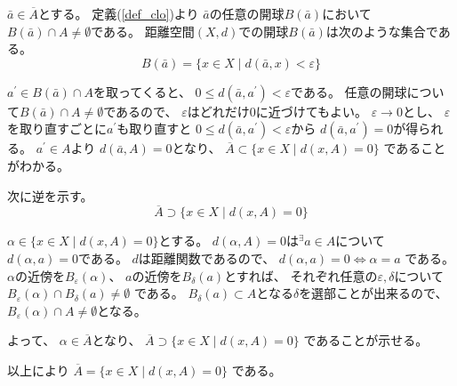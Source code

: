 \documentclass[12pt,b5paper]{ltjsarticle}
\begin{document}
\begin{enumerate}
      $\bar{a}\in \overline{A}$とする。
      定義(\ref{def_clo})より
      $\bar{a}$の任意の開球$B(\bar{a})$において
      $B(\bar{a})\cap A\ne\emptyset$である。
      距離空間$(X,d)$での開球$B(\bar{a})$は次のような集合である。
      \begin{equation}
       B(\bar{a}) = \{ x\in X \mid d(\bar{a},x)<\varepsilon \}
      \end{equation}

      $a^{\prime}\in B(\bar{a})\cap A$を取ってくると、
      $0\leq d(\bar{a},a^{\prime})<\varepsilon$である。
      任意の開球について$B(\bar{a})\cap A\ne\emptyset$であるので、
      $\varepsilon$はどれだけ$0$に近づけてもよい。
      $\varepsilon \rightarrow 0$とし、
      $\varepsilon$を取り直すごとに$a^{\prime}$も取り直すと
      $0\leq d(\bar{a},a^{\prime})<\varepsilon$から
      $d(\bar{a},a^{\prime})=0$が得られる。
      $a^{\prime}\in A$より
      $d(\bar{a},A)=0$となり、
      $\overline{A} \subset \{ x\in X \mid d(x,A)=0\}$
      であることがわかる。





      次に逆を示す。
      \begin{equation}
       \overline{A} \supset \{ x\in X \mid d(x,A)=0\}
      \end{equation}

      $\alpha \in \{ x\in X \mid d(x,A)=0\}$とする。
      $d(\alpha,A)=0$は${}^{\exists}a\in A$について
      $d(\alpha,a)=0$である。
      $d$は距離関数であるので、
      $d(\alpha,a)=0 \Leftrightarrow \alpha=a$
      である。
      $\alpha$の近傍を$B_{\varepsilon}(\alpha)$、
      $a$の近傍を$B_{\delta}(a)$とすれば、
      それぞれ任意の$\varepsilon,\delta$について
      $B_{\varepsilon}(\alpha)\cap B_{\delta}(a)\ne\emptyset$
      である。
      $B_{\delta}(a)\subset A$となる$\delta$を選部ことが出来るので、
      $B_{\varepsilon}(\alpha)\cap A \ne\emptyset$となる。

      よって、
      $\alpha\in \overline{A}$となり、
      $\overline{A} \supset \{ x\in X \mid d(x,A)=0\}$
      であることが示せる。


      以上により
      $\overline{A} = \{ x\in X \mid d(x,A)=0\}$
      である。


      \hrulefill

\end{enumerate}
\end{document}

